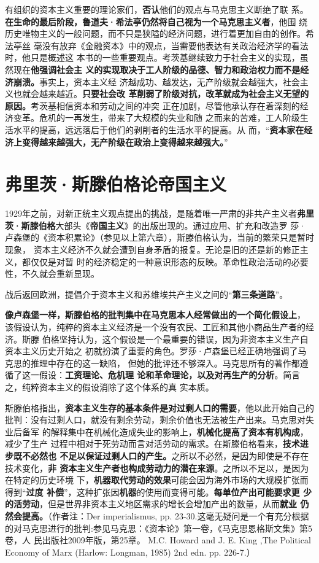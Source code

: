 有组织的资本主义重要的理论家们，\textbf{否认}他们的观点与马克思主义断绝了联
系。\textbf{在生命的最后阶段，鲁道夫·希法亭仍然将自己视为一个马克思主义者}，他围
绕历史唯物主义的一般问题，而不只是狭隘的经济问题，进行着更加自由的创作。希法亭丝
毫没有放弃《金融资本》中的观点，当需要他表达有关政治经济学的看法时，他只是概述这
本书的一些重要观点。考茨基继续致力于社会主义的实现，虽然现在\textbf{他强调社会主
  义的实现取决于工人阶级的品德、智力和政治权力而不是经济崩溃。}事实上，资本主义经
济越成功、越发达，无产阶级就会越强大，社会主义也就会越来越近。\textbf{只要社会改
  革削弱了阶级对抗，改革就成为社会主义无望的原因。}考茨基相信资本和劳动之间的冲突
正在加剧，尽管他承认存在着深刻的经济变革。危机的一再发生，带来了大规模的失业和随
之而来的苦难，工人阶级生活水平的提高，远远落后于他们的剥削者的生活水平的提高。从
而，“\textbf{资本家在经济上变得越来越强大，无产阶级在政治上变得越来越强大。}”

\section{弗里茨·斯滕伯格论帝国主义}

1929年之前，对新正统主义观点提出的挑战，是随着唯一严肃的非共产主义者\textbf{弗里
  茨·斯滕伯格}大部头《\textbf{帝国主义}》的出版出现的。通过应用、扩充和改造罗
莎·卢森堡的《资本积累论》（参见以上第六章），斯滕伯格认为，当前的繁荣只是暂时现象，
资本主义经济不久就会遭到自身矛盾的报复。无论是旧的还是新的修正主义，都仅仅是对暂
时的经济稳定的一种意识形态的反映。革命性政治活动的必要性，不久就会重新显现。

战后返回欧洲，提倡介于资本主义和苏维埃共产主义之间的“\textbf{第三条道路}”。

\textbf{像卢森堡一样，斯滕伯格的批判集中在马克思本人经常做出的一个简化假设上}，
该假设认为，纯粹的资本主义经济是一个没有农民、工匠和其他小商品生产者的经济。斯滕
伯格坚持认为，这个假设是一个最重要的错误，因为非资本主义生产自资本主义历史开始之
初就扮演了重要的角色。罗莎·卢森堡已经正确地强调了马克思的推理中存在的这一缺陷，
但她的批评还不够深入。马克思所有的著作都遵循了这一假设：\textbf{工资理论、危机理
论和革命理论，以及对再生产的分析}。简言之，纯粹资本主义的假设消除了这个体系的真
实本质。

斯滕伯格指出，\textbf{资本主义生存的基本条件是对过剩人口的需要}，他以此开始自己的
批判：没有过剩人口，就没有剩余劳动，剩余价值也无法被生产出来。马克思对失业后备军
的解释集中在机械化造成失业的影响上，\textbf{机械化提高了资本有机构成}，减少了生产
过程中相对于死劳动而言对活劳动的需求。在斯滕伯格看来，\textbf{技术进步既不必然也
  不足以保证过剩人口的产生。}之所以不必然，是因为即使是不存在技术变化，\textbf{非
  资本主义生产者也构成劳动力的潜在来源}。之所以不足以，是因为在特定的历史环境
下，\textbf{机器取代劳动的效果}可能会因为海外市场的大规模扩张而得到“\textbf{过度
  补偿}”，这种扩张因\textbf{机器}的使用而变得可能。\textbf{每单位产出可能要求更
  少的活劳动}，但是世界非资本主义地区需求的增长会增加产出的数量，从而\textbf{就业
  仍然会提高。}（作者注：Der imperialismus, pp. 23-30.这毫无疑问是一个有充分根据
的对马克思进行的批判:参见马克思：《资本论》第一卷，《马克思恩格斯文集》第5卷，人
民出版社2009年版，第25章。 M.C. Howard and J. E. King ,The Political Economy of
Marx (Harlow: Longman, 1985) 2nd edn. pp. 226-7.）

